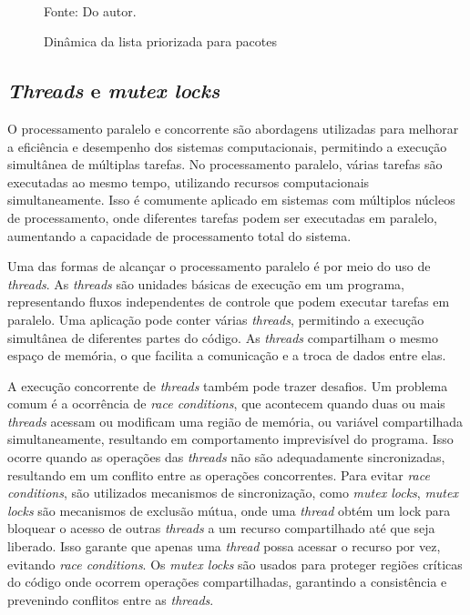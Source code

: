 \begin{figure}[ht]
	\centering
	\caption{Dinâmica da lista priorizada para pacotes}
	\\
	\label{fig:prio}
	\footnotesize{Fonte: Do autor.}
\end{figure}

\subsection{\textit{Threads} e \textit{mutex locks}}

O processamento paralelo e concorrente são abordagens utilizadas para melhorar a eficiência e desempenho dos sistemas computacionais, permitindo a execução simultânea de múltiplas tarefas. No processamento paralelo, várias tarefas são executadas ao mesmo tempo, utilizando recursos computacionais simultaneamente. Isso é comumente aplicado em sistemas com múltiplos núcleos de processamento, onde diferentes tarefas podem ser executadas em paralelo, aumentando a capacidade de processamento total do sistema.

Uma das formas de alcançar o processamento paralelo é por meio do uso de \textit{threads}. As \textit{threads} são unidades básicas de execução em um programa, representando fluxos independentes de controle que podem executar tarefas em paralelo. Uma aplicação pode conter várias \textit{threads}, permitindo a execução simultânea de diferentes partes do código. As \textit{threads} compartilham o mesmo espaço de memória, o que facilita a comunicação e a troca de dados entre elas.

A execução concorrente de \textit{threads} também pode trazer desafios. Um problema comum é a ocorrência de \textit{race conditions}, que acontecem quando duas ou mais \textit{threads} acessam ou modificam uma região de memória, ou variável compartilhada simultaneamente, resultando em comportamento imprevisível do programa. Isso ocorre quando as operações das \textit{threads} não são adequadamente sincronizadas, resultando em um conflito entre as operações concorrentes. Para evitar \textit{race conditions}, são utilizados mecanismos de sincronização, como \textit{mutex locks}, \textit{mutex locks} são mecanismos de exclusão mútua, onde uma \textit{thread} obtém um lock para bloquear o acesso de outras \textit{threads} a um recurso compartilhado até que seja liberado. Isso garante que apenas uma \textit{thread} possa acessar o recurso por vez, evitando \textit{race conditions}. Os \textit{mutex locks} são usados para proteger regiões críticas do código onde ocorrem operações compartilhadas, garantindo a consistência e prevenindo conflitos entre as \textit{threads}.

